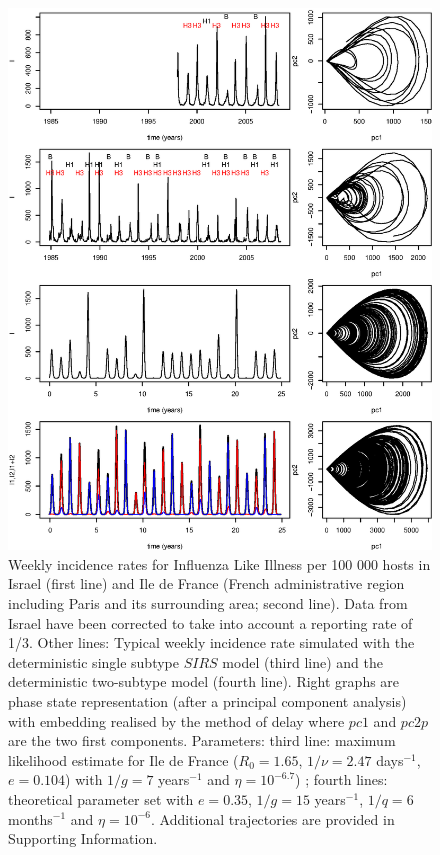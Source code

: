 \begin{figure}[htbp]
  \center
  \includegraphics[width= 0.8 \linewidth]{texte/article2/graph/all_reconstructed_bernard_theo.eps}
  \caption{Weekly incidence rates for Influenza Like Illness per 100
    000 hosts in Israel (first line) and Ile de France (French
    administrative region including Paris and its surrounding area;
    second line). Data from Israel have been corrected to take into
    account a reporting rate of 1/3.
    Other lines: Typical weekly incidence rate
    simulated with the deterministic single subtype $SIRS$ model (third
    line) and the deterministic two-subtype model (fourth line).
    Right graphs are phase state representation (after a principal
    component analysis) with embedding realised by the method of delay
    where $pc1$ and $pc2p$ are the two first components.
    Parameters: third line: maximum likelihood estimate for Ile de France
    ($R_0=1.65$, $1/\nu=2.47$ days$^{-1}$, $e=0.104$) with $1/g=7$
    years$^{-1}$ and $\eta=10^{-6.7}$) ; fourth lines: theoretical
    parameter set with $e=0.35$, $1/g=15$ years$^{-1}$, $1/q=6$
    months$^{-1}$ and $\eta=10^{-6}$.
    Additional trajectories are provided in Supporting Information.}
  \label{fig:attractor}
\end{figure}


